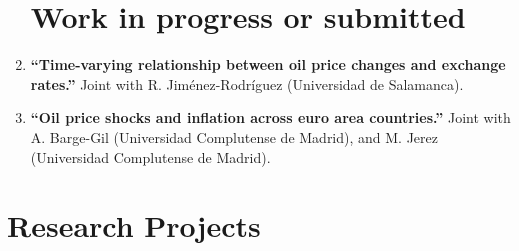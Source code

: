 \documentclass[11pt]{article}\usepackage[]{graphicx}\usepackage[]{color}
\begin{document}
\begin{enumerate}
\noindent
\section{Work in progress or submitted}

\item \textbf{``Time-varying relationship between oil price changes and exchange rates.''} Joint with R. Jiménez-Rodríguez (Universidad de Salamanca).

\item \textbf{``Oil price shocks and inflation across euro area countries.''} Joint with A. Barge-Gil (Universidad Complutense de Madrid), and M. Jerez (Universidad Complutense de Madrid).
\\
\end{enumerate}


\section{Research Projects} 
\end{document}
